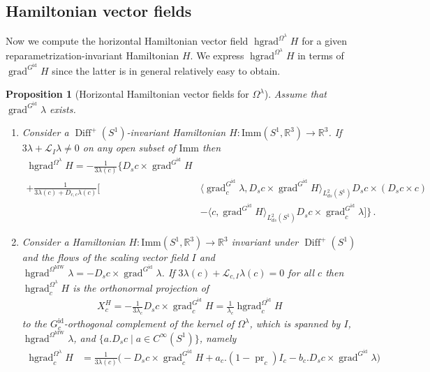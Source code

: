 \documentclass[12pt]{amsart}
\newcommand{\rev}[1]{#1}
\newtheorem{proposition}[theorem]{Proposition}
\theoremstyle{definition}
\newcommand{\R}{\mathbb R}
\newcommand{\Diffp}{\operatorname{Diff}^+(S^1)}
\newcommand{\id}{\mathrm{id}}
\newcommand{\Imm}{\mathrm{Imm}}
\newcommand{\OmMW}{\Omega^{\operatorname{MW}}}
\def\la{\lambda}
\def\Om{\Omega}
\def\x{\times}
\def\L{\mathcal{L}}
\def\R{{\mathbb R}}
\let\on=\operatorname
\begin{document}
\subsection{Hamiltonian vector fields}\label{sec:hamiltonian_conformal}
Now we compute the horizontal Hamiltonian vector field $\on{hgrad}^{\Om^\la}H$ for a given reparametrization-invariant Hamiltonian $H$. We express $\on{hgrad}^{\Om^\la}H$ in terms of $\on{grad}^{G^\id}H$ since the latter is in general relatively easy to obtain.


\begin{proposition}[Horizontal Hamiltonian vector fields for $\Om^{\la}$]
\label{prop:hamVF_conformal}  
Assume that $\on{grad}^{G^\id}\la$ exists.
 \begin{enumerate}[label=(\alph*)]
     \item \label{prop:hamVF_conformal_casea} Consider a $\Diffp$-invariant Hamiltonian $H\colon \Imm(S^1,\R^3)\to \R^3$. If $3\la + \L_I \la\neq 0$ on any open subset of $\Imm$ then
\begin{align}
    \on{hgrad}^{\Om^\la}H
    =-\frac{1}{3\rev{\lambda(c)}} \Bigg\{  D_s c\x \on{grad}^{G^\id} H& \\
    +  \frac{1}{3\rev{\lambda(c)}+D_{c,c}\rev{\lambda(c)}} \Big[& \langle \on{grad}_c^{G^\id}\la, D_s c\x \on{grad}^{G^\id}H\rangle_{L^2_{ds}(S^1)} D_s c \x (D_s c \x c) \\
     &- \langle  c, \on{grad}^{G^\id} H\rangle_{L^2_{ds}(S^1)} D_s c\x \on{grad}_c^{G^\id}\la \Big]\Bigg\}\,.
\end{align}
\item \label{prop:hamVF_conformal_caseb}Consider a Hamiltonian $H\colon \Imm(S^1,\R^3)\to \R^3$ invariant under $\Diffp$ and the flows of the scaling vector field $I$ and $\on{hgrad}^{\OmMW}\la= -D_sc\x \on{grad}^{G^\id}\la$. If $3\la\rev{(c)} + \rev{\L_{c,I}\la(c)} =0$ for all $c$ then $\on{hgrad}^{\Om^\la}_cH$ is the orthonormal projection of 
\begin{align}
    X^H_c
    =-\frac{1}{3\la_c} D_s c\x \on{grad}^{G^\id}_c H
    = \frac{1}{\la_c} \on{hgrad}^{\Om^\id}_c H
\end{align}
to the $G^\id_c$-orthogonal complement of the kernel of $\Om^\la$, which is spanned by $I$, $\on{hgrad}^{\OmMW}\lambda$, and $\{a.D_s c \mid a\in C^\infty(S^1)\}$, namely
\begin{align}
\on{hgrad}^{\Om^\la}_cH &=\frac{1}{3\rev{\lambda(c)}} \Big(- D_s c\x \on{grad}^{G^\id}_c H + a_c.(1-\on{pr}_c)I_c - b_c. D_s c \x \on{grad}^{G^\id}\la\Big)
\end{align}

\end{enumerate}
\end{proposition}
\end{document}
